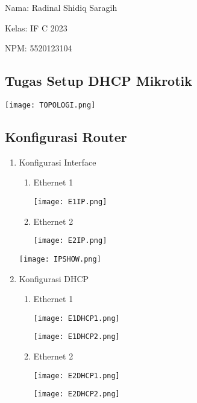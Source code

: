 \documentclass[12pt,a4paper]{article}
\date{}
\date{}
\begin{document}
Nama: Radinal Shidiq Saragih

Kelas: IF C 2023

NPM: 5520123104

\begin{center}
  \section*{Tugas Setup DHCP Mikrotik}
  \vspace{0.5cm}

    \texttt{[image: TOPOLOGI.png]}

  \vspace{0.5cm}
\end{center}

\subsection*{Konfigurasi Router}

\begin{enumerate}
  \item Konfigurasi Interface

    \begin{enumerate}
      \item Ethernet 1

        \texttt{[image: E1IP.png]}

      \item Ethernet 2

        \texttt{[image: E2IP.png]}

    \end{enumerate}

    \begin{center}
      \texttt{[image: IPSHOW.png]}
    \end{center}

  \item Konfigurasi DHCP

    \begin{enumerate}
      \item Ethernet 1

        \texttt{[image: E1DHCP1.png]}

        \texttt{[image: E1DHCP2.png]}

      \item Ethernet 2

        \texttt{[image: E2DHCP1.png]}

        \texttt{[image: E2DHCP2.png]}
    \end{enumerate}
\end{enumerate}
\end{document}
